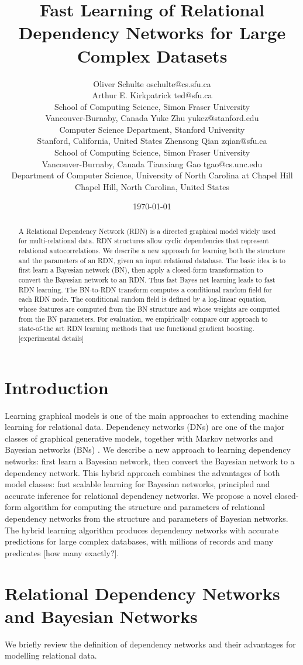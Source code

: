 \documentclass[twoside,11pt]{article}
\title{Fast Learning of Relational Dependency Networks for Large Complex Datasets}
\author{\name Oliver Schulte \email oschulte@cs.sfu.ca \\
       \name  Arthur E. Kirkpatrick \email ted@sfu.ca \\
       \addr School of Computing Science, Simon Fraser University\\
		Vancouver-Burnaby, Canada 
       \AND
       \name Yuke Zhu \email yukez@stanford.edu \\
       \addr Computer Science Department, Stanford University\\
		Stanford, California, United States 
       \AND
       \name Zhensong Qian \email zqian@sfu.ca \\
       \addr School of Computing Science, Simon Fraser University\\
		Vancouver-Burnaby, Canada 
		\AND
       \name Tianxiang Gao \email tgao@cs.unc.edu \\
       \addr Department of Computer Science, University of North Carolina at Chapel Hill\\
		Chapel Hill, North Carolina, United States 
		    }
\date{\today}
\begin{document}
\maketitle



\begin{abstract} 
A Relational Dependency Network (RDN) is a directed graphical model widely used for multi-relational data. RDN structures allow cyclic dependencies that represent relational autocorrelations. We describe a new approach for learning both the structure and the parameters of an RDN, given an input relational database. The basic idea is to first learn a Bayesian network (BN), then apply a closed-form transformation to convert the Bayesian network to an RDN. Thus fast Bayes net learning leads to fast RDN learning. The BN-to-RDN transform computes a conditional random field for each RDN node. The conditional random field is defined by a log-linear equation, whose features are computed from the BN structure and whose weights are computed from the BN parameters. For evaluation, we empirically compare our approach to state-of-the art RDN learning methods that use functional gradient boosting. [experimental details]\end{abstract}


 \section{Introduction} \label{sec:intro} Learning graphical models is one of the main approaches to extending machine learning for relational data. 
Dependency networks (DNs) \cite{Heckerman2000} are one of the major classes of graphical generative models, together with Markov networks and Bayesian networks (BNs) \cite{Pearl1988}. We describe a new approach to learning dependency networks: first learn a Bayesian network, then convert the Bayesian network to a dependency network. This hybrid approach combines the advantages of both model classes: fast scalable learning for Bayesian networks, principled and accurate inference for relational dependency networks. We propose a novel closed-form algorithm for computing the structure and parameters of relational dependency networks from the structure and parameters of Bayesian networks. The hybrid learning algorithm produces  dependency networks with accurate predictions for large complex databases, with millions of records and many predicates [how many exactly?]. 
  
 \section{Relational Dependency Networks and Bayesian Networks} We briefly review the definition of dependency networks and their advantages for modelling relational data. 
 
\end{document}
